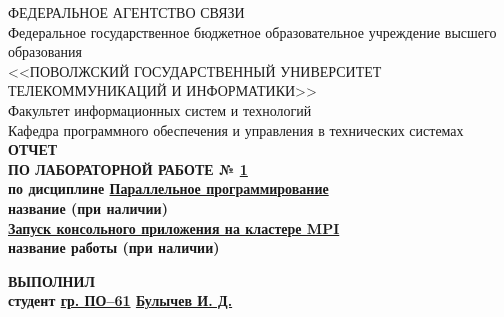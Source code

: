 \begin{titlepage}
	\begin{spacing}{1.1}
		\begin{center}		
			ФЕДЕРАЛЬНОЕ АГЕНТСТВО СВЯЗИ 
			\\
			Федеральное государственное бюджетное образовательное учреждение высшего образования
			\\
			<<ПОВОЛЖСКИЙ ГОСУДАРСТВЕННЫЙ УНИВЕРСИТЕТ ТЕЛЕКОММУНИКАЦИЙ И ИНФОРМАТИКИ>>
			\\			
			\vspace{1em}
			Факультет информационных систем и технологий
			\\
			Кафедра программного обеспечения и управления в технических системах
			\\
			\vspace{7em}
			\bfseries\Large
			ОТЧЕТ
			\\
			ПО ЛАБОРАТОРНОЙ РАБОТЕ № \underline{\hspace{0.4em}1\hspace{0.4em}}
			\\
			\vspace{0.5em}
			\normalfont
			\normalsize
			по дисциплине
			\underline{\hspace{4em}Параллельное программирование\hspace{4em}}
			\\
			\small
			\hspace{4em} название (при наличии)
			\normalsize
			\\
			\hspace{3em}			
			\underline{\hspace{3em}Запуск консольного приложения на кластере MPI\hspace{3em}}
			\\
			\small
			\hspace{4em} название работы (при наличии)
			\normalsize
			\\		
	\end{center}			
			\vspace{5em}
			\begin{minipage}{0.5\textwidth}
				\begin{flushleft}					
				\end{flushleft}
			\end{minipage}
			\begin{minipage}{0.5\textwidth}
				\begin{center}
					\bfseries
					ВЫПОЛНИЛ
					\\
					\normalfont
					студент \hspace{1ex} \underline{гр. ПО--61} \hspace{1ex} \underline{Булычев И. Д.}

\end{center}
\end{minipage}
\end{spacing}
\end{titlepage}
